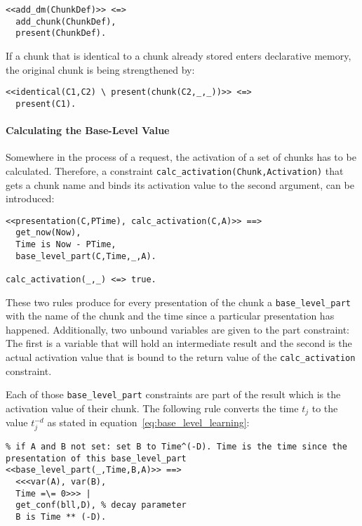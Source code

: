 \begin{lstlisting}
<<add_dm(ChunkDef)>> <=> 
  add_chunk(ChunkDef), 
  present(ChunkDef). 
\end{lstlisting}

If a chunk that is identical to a chunk already stored enters declarative memory, the original chunk is being strengthened by:

\begin{lstlisting}
<<identical(C1,C2) \ present(chunk(C2,_,_))>> <=> 
  present(C1).
\end{lstlisting}

\paragraph{Calculating the Base-Level Value}

Somewhere in the process of a request, the activation of a set of chunks has to be calculated. Therefore, a constraint \lstinline|calc_activation(Chunk,Activation)|  that gets a chunk name and binds its activation value to the second argument, can be introduced:

\begin{lstlisting}
<<presentation(C,PTime), calc_activation(C,A)>> ==> 
  get_now(Now), 
  Time is Now - PTime, 
  base_level_part(C,Time,_,A).
  
calc_activation(_,_) <=> true.
\end{lstlisting}

These two rules produce for every presentation of the chunk a \lstinline|base_level_part| with the name of the chunk and the time since a particular presentation has happened. Additionally, two unbound variables are given to the part constraint: The first is a variable that will hold an intermediate result and the second is the actual activation value that is bound to the return value of the \lstinline|calc_activation| constraint.

Each of those \lstinline|base_level_part| constraints are part of the result which is the activation value of their chunk. The following rule converts the time $t_j$ to the value $t_j^{-d}$ as stated in equation~\eqref{eq:base_level_learning}:

\begin{lstlisting}
% if A and B not set: set B to Time^(-D). Time is the time since the presentation of this base_level_part
<<base_level_part(_,Time,B,A)>> ==>
  <<<var(A), var(B), 
  Time =\= 0>>> |
  get_conf(bll,D), % decay parameter
  B is Time ** (-D).
\end{lstlisting}


